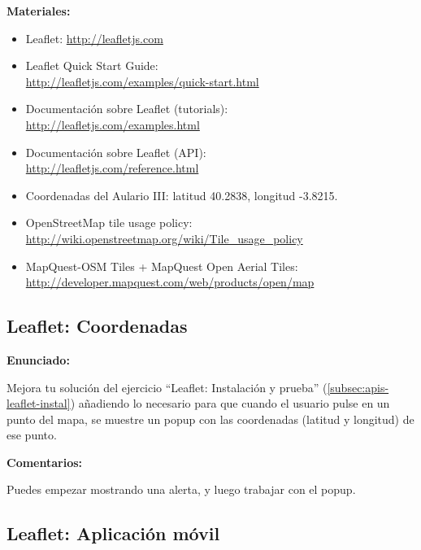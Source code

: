 \textbf{Materiales:}

\begin{itemize}
\item Leaflet: \url{http://leafletjs.com}
\item Leaflet Quick Start Guide: \\
  \url{http://leafletjs.com/examples/quick-start.html}
\item Documentación sobre Leaflet (tutorials): \\
  \url{http://leafletjs.com/examples.html}
\item Documentación sobre Leaflet (API): \\
  \url{http://leafletjs.com/reference.html}
\item Coordenadas del Aulario III: latitud 40.2838, longitud -3.8215.
\item OpenStreetMap tile usage policy: \\
  \url{http://wiki.openstreetmap.org/wiki/Tile_usage_policy}
\item MapQuest-OSM Tiles + MapQuest Open Aerial Tiles: \\
  \url{http://developer.mapquest.com/web/products/open/map}
\end{itemize}

\subsection{Leaflet: Coordenadas}
\label{subsec:apis-leaflet-coordenadas}

\textbf{Enunciado:}

Mejora tu solución del ejercicio ``Leaflet: Instalación y prueba'' (\ref{subsec:apis-leaflet-instal}) añadiendo lo necesario para que cuando el usuario pulse en un punto del mapa, se muestre un popup con las coordenadas (latitud y longitud) de ese punto.

\textbf{Comentarios:}

Puedes empezar mostrando una alerta, y luego trabajar con el popup.

\subsection{Leaflet: Aplicación móvil}
\label{subsec:apis-leaflet-movil}

